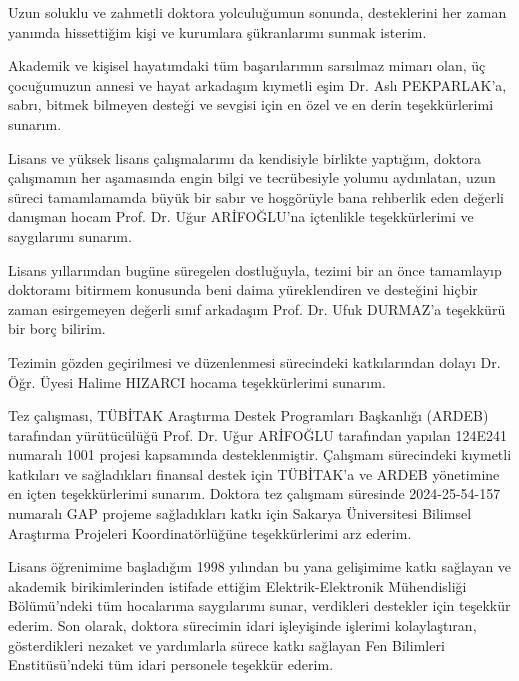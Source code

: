\begin{tesekkur}
Uzun soluklu ve zahmetli doktora yolculuğumun sonunda, desteklerini her zaman yanımda hissettiğim kişi ve kurumlara şükranlarımı sunmak isterim.

Akademik ve kişisel hayatımdaki tüm başarılarımın sarsılmaz mimarı olan, üç çocuğumuzun annesi ve hayat arkadaşım kıymetli eşim Dr. Aslı PEKPARLAK'a, sabrı, bitmek bilmeyen desteği ve sevgisi için en özel ve en derin teşekkürlerimi sunarım.

Lisans ve yüksek lisans çalışmalarımı da kendisiyle birlikte yaptığım, doktora çalışmamın her aşamasında engin bilgi ve tecrübesiyle yolumu aydınlatan, uzun süreci tamamlamamda büyük bir sabır ve hoşgörüyle bana rehberlik eden değerli danışman hocam Prof. Dr. Uğur ARİFOĞLU'na içtenlikle teşekkürlerimi ve saygılarımı sunarım.

Lisans yıllarımdan bugüne süregelen dostluğuyla, tezimi bir an önce tamamlayıp doktoramı bitirmem konusunda beni daima yüreklendiren ve desteğini hiçbir zaman esirgemeyen değerli sınıf arkadaşım Prof. Dr. Ufuk DURMAZ'a teşekkürü bir borç bilirim.

Tezimin gözden geçirilmesi ve düzenlenmesi sürecindeki katkılarından dolayı Dr. Öğr. Üyesi Halime HIZARCI hocama teşekkürlerimi sunarım.

Tez çalışması, TÜBİTAK Araştırma Destek Programları Başkanlığı (ARDEB) tarafından yürütücülüğü Prof. Dr. Uğur ARİFOĞLU tarafından yapılan 124E241 numaralı 1001 projesi kapsamında desteklenmiştir. Çalışmam sürecindeki kıymetli katkıları ve sağladıkları finansal destek için TÜBİTAK'a ve ARDEB yönetimine en içten teşekkürlerimi sunarım. Doktora tez çalışmam süresinde 2024-25-54-157 numaralı GAP projeme sağladıkları katkı için Sakarya Üniversitesi Bilimsel Araştırma Projeleri Koordinatörlüğüne teşekkürlerimi arz ederim.

Lisans öğrenimime başladığım 1998 yılından bu yana gelişimime katkı sağlayan ve akademik birikimlerinden istifade ettiğim Elektrik-Elektronik Mühendisliği Bölümü'ndeki tüm hocalarıma saygılarımı sunar, verdikleri destekler için teşekkür ederim. Son olarak, doktora sürecimin idari işleyişinde işlerimi kolaylaştıran, gösterdikleri nezaket ve yardımlarla sürece katkı sağlayan Fen Bilimleri Enstitüsü'ndeki tüm idari personele teşekkür ederim.
\end{tesekkur}
